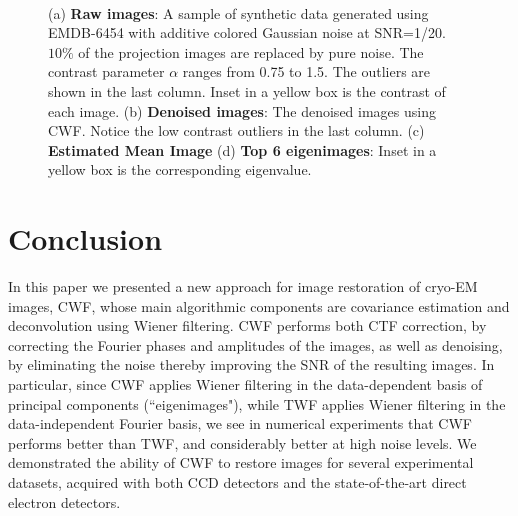 \documentclass[review]{elsarticle}
\begin{document}
\begin{figure}[]
\centering
{}
\quad
{} \\
\quad
{}
\caption{(a) \textbf{Raw images}: 
A sample of synthetic 
data 
generated using EMDB-6454 with additive colored Gaussian noise at SNR=1/20.\ $10\%$ of
the projection images are replaced by pure noise. The contrast parameter $\alpha$ ranges from 0.75 to 1.5. The outliers are shown in the last column. Inset 
in a yellow box is the contrast of each image.
(b) \textbf{Denoised images}: 
The denoised images using CWF. Notice the low contrast outliers in the last column. (c) \textbf{Estimated Mean Image}
(d) \textbf{Top 6 eigenimages}: 
Inset in a yellow box is the corresponding eigenvalue.}
\end{figure}

\section{Conclusion}
In this paper we presented a new approach for image restoration of cryo-EM images, CWF, whose
main algorithmic components are covariance estimation and deconvolution using Wiener filtering.
CWF performs both CTF correction, by correcting the Fourier phases and amplitudes of the images, 
as well as denoising, by eliminating the noise thereby improving the SNR of the resulting images.
In particular, since CWF applies Wiener filtering in the data-dependent basis of principal components (``eigenimages"),
while TWF applies Wiener filtering in the data-independent Fourier basis, we see
in numerical experiments that CWF performs better than TWF, and considerably better at high noise levels.
We demonstrated the ability of CWF to restore images for several 
experimental datasets, acquired with both CCD detectors and the state-of-the-art direct electron detectors.
\end{document}

